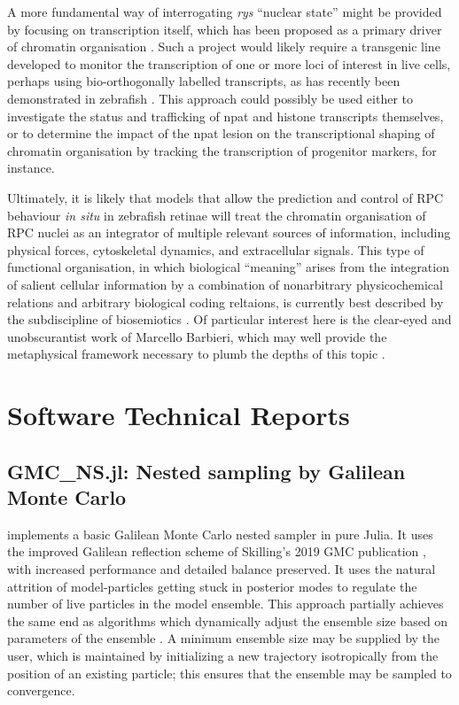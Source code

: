 \documentclass{ut-thesis}
\begin{document}
\begin{NoHyper}
A more fundamental way of interrogating \textit{rys} ``nuclear state'' might be provided by focusing on transcription itself, which has been proposed as a primary driver of chromatin organisation \cite{Cook2018}. Such a project would likely require a transgenic line developed to monitor the transcription of one or more loci of interest in live cells, perhaps using bio-orthogonally labelled transcripts, as has recently been demonstrated in zebrafish \cite{Westerich2020}. This approach could possibly be used either to investigate the status and trafficking of npat and histone transcripts themselves, or to determine the impact of the npat lesion on the transcriptional shaping of chromatin organisation by tracking the transcription of progenitor markers, for instance.

Ultimately, it is likely that models that allow the prediction and control of RPC behaviour \textit{in situ} in zebrafish retinae will treat the chromatin organisation of RPC nuclei as an integrator of multiple relevant sources of information, including physical forces, cytoskeletal dynamics, and extracellular signals. This type of functional organisation, in which biological ``meaning'' arises from the integration of salient cellular information by a combination of nonarbitrary physicochemical relations and arbitrary biological coding reltaions, is currently best described by the subdiscipline of biosemiotics \cite{Hoffmeyer2008,Favareau2015,Hoffmeyer2015}. Of particular interest here is the clear-eyed and unobscurantist work of Marcello Barbieri, which may well provide the metaphysical framework necessary to plumb the depths of this topic \cite{Barbieri2014}.
\part{Software Technical Reports}
\chapter{GMC\_NS.jl: Nested sampling by Galilean Monte Carlo}
\label{chap:GMC}
 implements a basic Galilean Monte Carlo nested sampler \cite{Skilling2012,Skilling2019} in pure Julia. It uses the improved Galilean reflection scheme of Skilling's 2019 GMC publication \cite{Skilling2019}, with increased performance and detailed balance preserved. It uses the natural attrition of model-particles getting stuck in posterior modes to regulate the number of live particles in the model ensemble. This approach partially achieves the same end as algorithms which dynamically adjust the ensemble size based on parameters of the ensemble \cite{Feroz2009,Higson2019}. A minimum ensemble size may be supplied by the user, which is maintained by initializing a new trajectory isotropically from the position of an existing particle; this ensures that the ensemble may be sampled to convergence.


\end{NoHyper}
\end{document}
